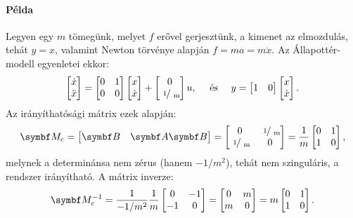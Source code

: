 \paragraph{Példa} Legyen egy $m$ tömegünk, melyet $f$ erővel gerjesztünk, a
kimenet az elmozdulás, tehát $y = x$, valamint Newton törvénye alapján
$f = ma = m \ddot x$. Az Állapottér-modell egyenletei ekkor:
\begin{equation}
  \begin{bmatrix}
    \dot x \\ \ddot x
  \end{bmatrix} = \begin{bmatrix}
    0 & 1 \\ 0 & 0
  \end{bmatrix} \begin{bmatrix}
    x \\ \dot x
  \end{bmatrix} + \begin{bmatrix}
    0 \\ \slashfrac{1}{m}
  \end{bmatrix} u,
  \quad \text{ és } \quad
  y = \begin{bmatrix}
    1 & 0
  \end{bmatrix} \begin{bmatrix}
    x \\ \dot x
  \end{bmatrix}.
\end{equation}
Az irányíthatósági mátrix ezek alapján:
\begin{equation}
  \rmat M_c = \begin{bmatrix}
    \rmat B & \rmat A \rmat B
  \end{bmatrix} = \begin{bmatrix}
    0                & \slashfrac{1}{m} \\
    \slashfrac{1}{m} & 0
  \end{bmatrix} = \frac{1}{m} \begin{bmatrix}
    0 & 1 \\ 1 & 0
  \end{bmatrix},
\end{equation}
melynek a determinánsa nem zérus (hanem $-1/m^2$), tehát nem szinguláris,
a rendszer irányítható. A mátrix inverze:
\begin{equation}
  \rmat M_c^{-1} = \frac{1}{-1/m^2} \frac{1}{m} \begin{bmatrix}
    0 & -1 \\ -1 & 0
  \end{bmatrix} = \begin{bmatrix}
    0 & m \\ m & 0
  \end{bmatrix} = m \begin{bmatrix}
    0 & 1 \\ 1 & 0
  \end{bmatrix}.
\end{equation}
